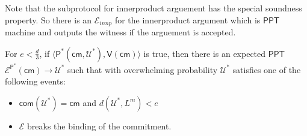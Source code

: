 \documentclass[runningheads]{llncs}
\newcommand{\innp}[2]{\langle #1,#2\rangle}
\newcommand{\pnote}[1] {\textcolor{red}  {PKP: \sl{#1}}}
\def\ppt{\mathsf{PPT}}
\def\extrac{\mathcal{E}}
\def\prover{\mathsf{P}}
\def\verifier{\mathsf{V}}
\def\cm{\mathsf{cm}} %
\def\com{\mathsf{com}} %
\def\calU{\mathcal{U}}
\begin{document}
	Note that the subprotocol for innerproduct arguement has the special soundness property. So there is an $\extrac_{innp}$ for the innerproduct argument which is $\ppt$ machine and outputs the witness if the arguement is accepted.
	\begin{theorem}\label{theo:1}
		For $e < \frac{d}{3} $, if $\innp{\prover^*(\cm, \calU^*)}{\verifier(\cm)} $ is true, then there is an expected $\ppt$ $\extrac^{\prover^*}(\cm) \rightarrow \calU^*$ such that with overwhelming probability $\calU^*$ satisfies one of the following events: 
		\begin{itemize}
			\item $\com(\calU^*) = \cm$ and $ d(\calU^*, L^m) < e$
			\item $\extrac$ breaks the binding of the commitment. 
		\end{itemize} 
		\begin{comment}
		There is an $\ppt$ extractor $\extrac$ which has oracle access to $\prover$ such that rewinding a certain step of $\prover$, $\extrac$ can output the witness $x$ with overwhelming probability for which $\prover$ can convince $\verifier$.
		\end{comment}
	\end{theorem}
\end{document}
